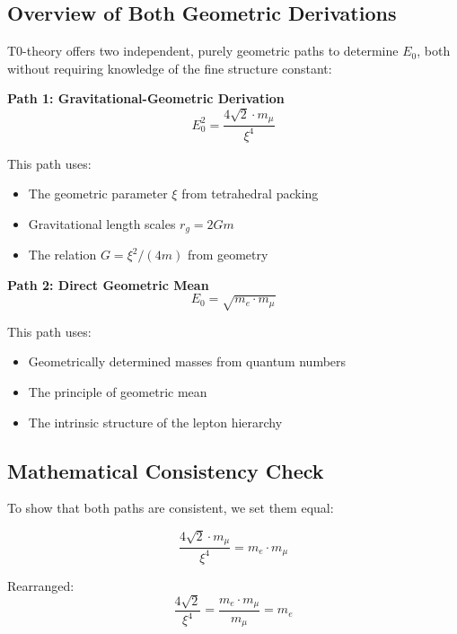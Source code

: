 \documentclass[12pt,a4paper]{article}
\begin{document}
	\subsection{Overview of Both Geometric Derivations}
	
	T0-theory offers two independent, purely geometric paths to determine $E_0$, both without requiring knowledge of the fine structure constant:
	
	\textbf{Path 1: Gravitational-Geometric Derivation}
	\begin{equation}
		E_0^2 = \frac{4\sqrt{2} \cdot m_\mu}{\xi^4}
	\end{equation}
	
	This path uses:
	\begin{itemize}
		\item The geometric parameter $\xi$ from tetrahedral packing
		\item Gravitational length scales $r_g = 2Gm$
		\item The relation $G = \xi^2/(4m)$ from geometry
	\end{itemize}
	
	\textbf{Path 2: Direct Geometric Mean}
	\begin{equation}
		E_0 = \sqrt{m_e \cdot m_\mu}
	\end{equation}
	
	This path uses:
	\begin{itemize}
		\item Geometrically determined masses from quantum numbers
		\item The principle of geometric mean
		\item The intrinsic structure of the lepton hierarchy
	\end{itemize}
	
	\subsection{Mathematical Consistency Check}
	
	To show that both paths are consistent, we set them equal:
	
	\begin{equation}
		\frac{4\sqrt{2} \cdot m_\mu}{\xi^4} = m_e \cdot m_\mu
	\end{equation}
	
	Rearranged:
	\begin{equation}
		\frac{4\sqrt{2}}{\xi^4} = \frac{m_e \cdot m_\mu}{m_\mu} = m_e
	\end{equation}
	
\end{document}
